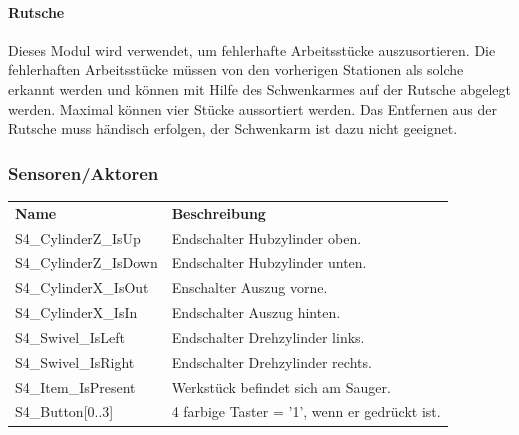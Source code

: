 \documentclass[11pt,a4paper,ngerman]{article}
\begin{document}
\paragraph{Rutsche}
Dieses Modul wird verwendet, um fehlerhafte Arbeitsstücke auszusortieren. Die fehlerhaften Arbeitsstücke müssen von den vorherigen Stationen als solche erkannt werden und können mit Hilfe des Schwenkarmes auf der Rutsche abgelegt werden. Maximal können vier Stücke aussortiert werden. Das Entfernen aus der Rutsche muss händisch erfolgen, der Schwenkarm ist dazu nicht geeignet.

\subsubsection{Sensoren/Aktoren}
\begin{center}
	\setlength\extrarowheight{4pt}
	\small
	\begin{tabularx}{\textwidth}{|p{4cm}|X|}
		\hline
		\rowcolor{tublau}
		\multicolumn{2}{|c|}{\bf \color{white} \large Sensoren}\\
		\hline\hline
		\rowcolor{gray!80}
		\bf Name & \bf Beschreibung\\
		\hline\hline
		S4\_CylinderZ\_IsUp & Endschalter Hubzylinder oben.\\
		S4\_CylinderZ\_IsDown & Endschalter Hubzylinder unten.\\
		S4\_CylinderX\_IsOut & Enschalter Auszug vorne.\\
		S4\_CylinderX\_IsIn & Endschalter Auszug hinten.\\
		S4\_Swivel\_IsLeft & Endschalter Drehzylinder links.\\
		S4\_Swivel\_IsRight & Endschalter Drehzylinder rechts.\\
		S4\_Item\_IsPresent & Werkstück befindet sich am Sauger.\\
		S4\_Button[0..3] & 4 farbige Taster = '1', wenn er gedrückt ist.\\
		\hline
	\end{tabularx}
	
	\medskip
	

\end{center}
\end{document}
